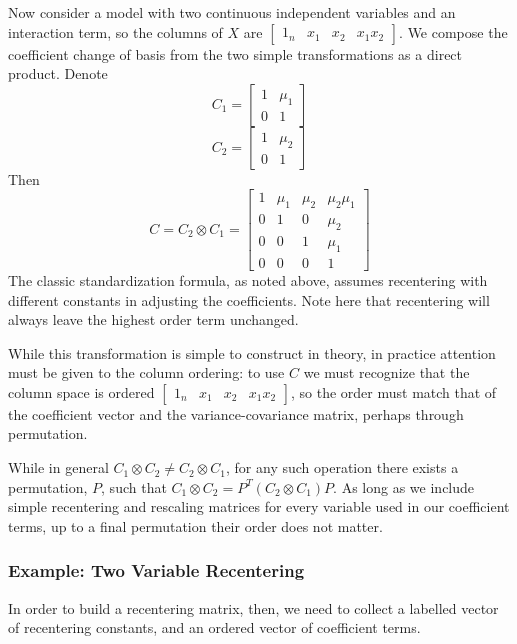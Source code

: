 \documentclass[]{article}
\begin{document}
Now consider a model with two continuous independent variables and an
interaction term, so the columns of \(X\) are
\(\begin{bmatrix} 1_n &x_1 &x_2 &x_1x_2 \end{bmatrix}\). We compose the
coefficient change of basis from the two simple transformations as a
direct product. Denote
\[C_1=\begin{bmatrix}1 & \mu_1 \\ 0 & 1 \end{bmatrix}\]
\[C_2=\begin{bmatrix}1 & \mu_2 \\ 0 & 1 \end{bmatrix}\] Then
\[C = C_2 \otimes C_1 = \begin{bmatrix} 1 & \mu_1 &\mu_2 &\mu_2\mu_1 \\
  0 &1 &0 &\mu_2 \\ 0 &0 &1 &\mu_1 \\ 0 &0 &0 &1 \end{bmatrix}\] The
classic standardization formula, as noted above, assumes recentering
with different constants in adjusting the coefficients. Note here that
recentering will always leave the highest order term unchanged.

While this transformation is simple to construct in theory, in practice
attention must be given to the column ordering: to use \(C\) we must
recognize that the column space is ordered
\(\begin{bmatrix} 1_n &x_1 &x_2 &x_1x_2 \end{bmatrix}\), so the order
must match that of the coefficient vector and the variance-covariance
matrix, perhaps through permutation.

While in general \(C_1 \otimes C_2 \neq C_2 \otimes C_1\), for any such
operation there exists a permutation, \(P\), such that
\(C_1 \otimes C_2 = P^T(C_2 \otimes C_1)P\). As long as we include
simple recentering and rescaling matrices for every variable used in our
coefficient terms, up to a final permutation their order does not
matter.

\hypertarget{example-two-variable-recentering}{%
\subsubsection{Example: Two Variable
Recentering}\label{example-two-variable-recentering}}

In order to build a recentering matrix, then, we need to collect a
labelled vector of recentering constants, and an ordered vector of
coefficient terms.
\end{document}
